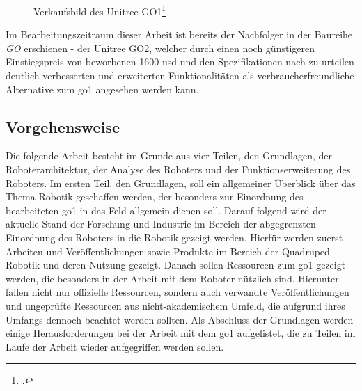 \begin{figure}[h]
    \caption{Verkaufsbild des Unitree GO1\footcite{go1-ad-foto}}\label{fig:go1-ad-foto}
\end{figure}


Im Bearbeitungszeitraum dieser Arbeit ist bereits der Nachfolger in der Baureihe \emph{GO} erschienen - der Unitree GO2,
welcher durch einen noch günstigeren Einstiegspreis von beworbenen \num{1600} \gls{usd} und den Spezifikationen nach zu urteilen
deutlich verbesserten und erweiterten Funktionalitäten als verbraucherfreundliche Alternative zum \gls{go1} angesehen
werden kann.

\subsection{Vorgehensweise}
\label{subsec:intro-vorgehensweise}

Die folgende Arbeit besteht im Grunde aus vier Teilen, den Grundlagen, der Roboterarchitektur, der Analyse des Roboters
und der Funktionserweiterung des Roboters.
Im ersten Teil, den Grundlagen, soll ein allgemeiner Überblick über das Thema Robotik geschaffen werden, der besonders zur
Einordnung des bearbeiteten \gls{go1} in das Feld allgemein dienen soll.
Darauf folgend wird der aktuelle Stand der Forschung und Industrie im Bereich der abgegrenzten Einordnung des Roboters
in die Robotik gezeigt werden.
Hierfür werden zuerst Arbeiten und Veröffentlichungen sowie Produkte im Bereich der Quadruped Robotik und deren Nutzung
gezeigt.
Danach sollen Ressourcen zum \gls{go1} gezeigt werden, die besonders in der Arbeit mit dem Roboter nützlich sind.
Hierunter fallen nicht nur offizielle Ressourcen, sondern auch verwandte Veröffentlichungen und ungeprüfte Ressourcen
aus nicht-akademischem Umfeld, die aufgrund ihres Umfangs dennoch beachtet werden sollten.
Als Abschluss der Grundlagen werden einige Herausforderungen bei der Arbeit mit dem \gls{go1} aufgelistet, die zu Teilen
im Laufe der Arbeit wieder aufgegriffen werden sollen.


